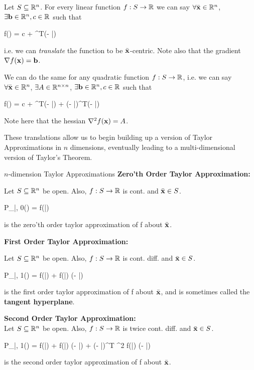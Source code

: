 Let $S \subseteq \mathbb{R}^n$. For every linear function $f: S \rightarrow \mathbb{R}$
we can say $\forall \bar{\mathbf{x}} \in \mathbb{R}^n$, $\exists \mathbf{b} \in \mathbb{R}^n, 
c \in \mathbb{R}$ such that 

\begin{frml}
		f(\vx) = c + \vb^T(\vx - \bar{\vx})
\end{frml}
i.e. we can \textit{translate} the function to be $\bar{\mathbf{x}}$-centric. 
Note also that the gradient $\nabla f(\mathbf{x}) = \mathbf{b}$.

We can do the same for any quadratic function $f: S \rightarrow \mathbb{R}$, i.e.
we can say $\forall \bar{\mathbf{x}} \in \mathbb{R}^n$, $\exists A \in \mathbb{R}^{n \times n}$,
$\exists \mathbf{b} \in \mathbb{R}^n, c \in \mathbb{R}$ such that
\begin{frml}
		f(\vx) = c + \vb^T(\vx - \bar{\vx}) + (\vx - 
		\bar{\vx})^T\vA(\vx - \bar{\vx})
\end{frml}
Note here that the hessian $\nabla^2f(\mathbf{x}) = A$.

These translations allow us to begin building up a version of Taylor Approximations
in $n$ dimensions, eventually leading to a multi-dimensional version of 
Taylor's Theorem.

\begin{defn}{$n$-dimension Taylor Approximations}{}
\textbf{Zero'th Order Taylor Approximation:}

\bigskip
Let $S \subseteq \mathbb{R}^n$ be open. Also, $f: S \rightarrow \mathbb{R}$ is cont.
and $\bar{\mathbf{x}} \in S$.
\begin{frml}
	P_{\bar{\vx}, 0}(\vx) = f(\bar{\vx})
\end{frml}
is the zero'th order taylor approximation of f about $\bar{\mathbf{x}}$.

\bigskip
\textbf{First Order Taylor Approximation:}
\bigskip

Let $S \subseteq \mathbb{R}^n$ be open. Also, $f: S \rightarrow \mathbb{R}$ is cont. 
diff. and $\bar{\mathbf{x}} \in S$.
\begin{frml}
	P_{\bar{\vx}, 1}(\vx) = f(\bar{\vx}) + \nabla f(\bar{\vx}) (\vx - \bar{\vx})
\end{frml}
is the first order taylor approximation of f about $\bar{\mathbf{x}}$, and is sometimes called
the \textbf{tangent hyperplane}.
\bigskip

\textbf{Second Order Taylor Approximation:}
\bigskip \\
Let $S \subseteq \mathbb{R}^n$ be open. Also, $f: S \rightarrow \mathbb{R}$ is twice 
cont.  diff. and $\bar{\mathbf{x}} \in S$.
\begin{frml}
	P_{\bar{\vx}, 1}(\vx) = f(\bar{\vx}) + \nabla f(\bar{\vx}) (\vx - \bar{\vx})
	+ (\vx - \bar{\vx})^T \nabla^2 f(\bar{\vx}) (\vx - \bar{\vx})
\end{frml}
is the second order taylor approximation of f about $\bar{\mathbf{x}}$.
\end{defn}

